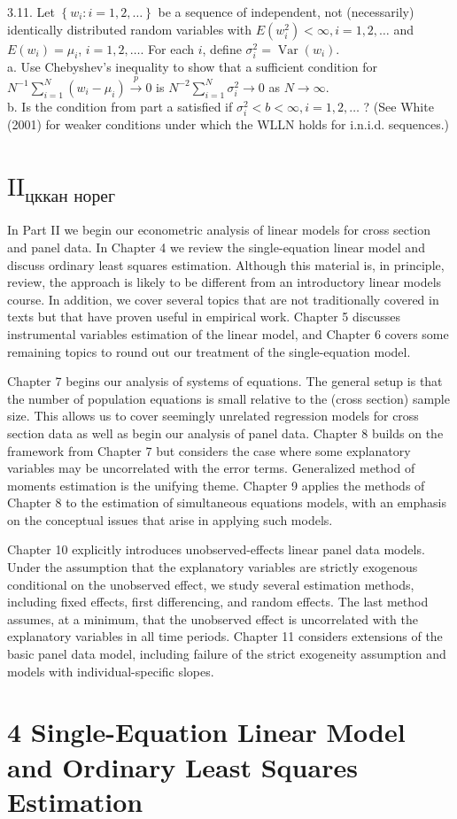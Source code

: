 \documentclass[10pt]{article}
\begin{document}
3.11. Let $\left\{w_{i}: i=1,2, \ldots\right\}$ be a sequence of independent, not (necessarily) identically distributed random variables with $E\left(w_{i}^{2}\right)<\infty, i=1,2, \ldots$ and $E\left(w_{i}\right)=\mu_{i}$, $i=1,2, \ldots$. For each $i$, define $\sigma_{i}^{2}=\operatorname{Var}\left(w_{i}\right)$.\\
a. Use Chebyshev's inequality to show that a sufficient condition for $N^{-1} \sum_{i=1}^{N}\left(w_{i}-\mu_{i}\right) \xrightarrow{p} 0$ is $N^{-2} \sum_{i=1}^{N} \sigma_{i}^{2} \rightarrow 0$ as $N \rightarrow \infty$.\\
b. Is the condition from part a satisfied if $\sigma_{i}^{2}<b<\infty, i=1,2, \ldots$ ? (See White (2001) for weaker conditions under which the WLLN holds for i.n.i.d. sequences.)

\section*{$\mathrm{II}_{\text {цккан норег }}$}
In Part II we begin our econometric analysis of linear models for cross section and panel data. In Chapter 4 we review the single-equation linear model and discuss ordinary least squares estimation. Although this material is, in principle, review, the approach is likely to be different from an introductory linear models course. In addition, we cover several topics that are not traditionally covered in texts but that have proven useful in empirical work. Chapter 5 discusses instrumental variables estimation of the linear model, and Chapter 6 covers some remaining topics to round out our treatment of the single-equation model.

Chapter 7 begins our analysis of systems of equations. The general setup is that the number of population equations is small relative to the (cross section) sample size. This allows us to cover seemingly unrelated regression models for cross section data as well as begin our analysis of panel data. Chapter 8 builds on the framework from Chapter 7 but considers the case where some explanatory variables may be uncorrelated with the error terms. Generalized method of moments estimation is the unifying theme. Chapter 9 applies the methods of Chapter 8 to the estimation of simultaneous equations models, with an emphasis on the conceptual issues that arise in applying such models.

Chapter 10 explicitly introduces unobserved-effects linear panel data models. Under the assumption that the explanatory variables are strictly exogenous conditional on the unobserved effect, we study several estimation methods, including fixed effects, first differencing, and random effects. The last method assumes, at a minimum, that the unobserved effect is uncorrelated with the explanatory variables in all time periods. Chapter 11 considers extensions of the basic panel data model, including failure of the strict exogeneity assumption and models with individual-specific slopes.

\section*{4 Single-Equation Linear Model and Ordinary Least Squares Estimation}
\end{document}
